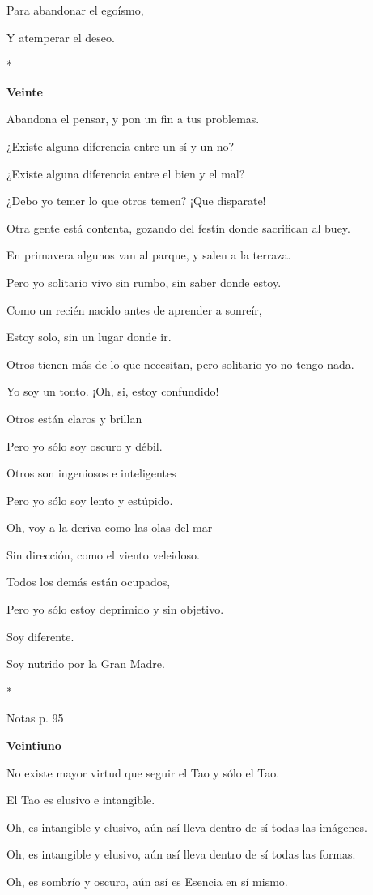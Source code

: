 Para abandonar el egoísmo,

Y atemperar el deseo.

*

\textbf{Veinte}

Abandona el pensar, y pon un fin a tus problemas.

¿Existe alguna diferencia entre un sí y un no?

¿Existe alguna diferencia entre el bien y el mal?

¿Debo yo temer lo que otros temen? ¡Que disparate!

Otra gente está contenta, gozando del festín donde sacrifican al buey.

En primavera algunos van al parque, y salen a la terraza.

Pero yo solitario vivo sin rumbo, sin saber donde estoy.

Como un recién nacido antes de aprender a sonreír,

Estoy solo, sin un lugar donde ir.

Otros tienen más de lo que necesitan, pero solitario yo no tengo nada.

Yo soy un tonto. ¡Oh, si, estoy confundido!

Otros están claros y brillan

Pero yo sólo soy oscuro y débil.

Otros son ingeniosos e inteligentes

Pero yo sólo soy lento y estúpido.

Oh, voy a la deriva como las olas del mar -\/-

Sin dirección, como el viento veleidoso.

Todos los demás están ocupados,

Pero yo sólo estoy deprimido y sin objetivo.

Soy diferente.

Soy nutrido por la Gran Madre.

*

Notas p. 95

\textbf{Veintiuno}

No existe mayor virtud que seguir el Tao y sólo el Tao.

El Tao es elusivo e intangible.

Oh, es intangible y elusivo, aún así lleva dentro de sí todas las
imágenes.

Oh, es intangible y elusivo, aún así lleva dentro de sí todas las
formas.

Oh, es sombrío y oscuro, aún así es Esencia en sí mismo.

